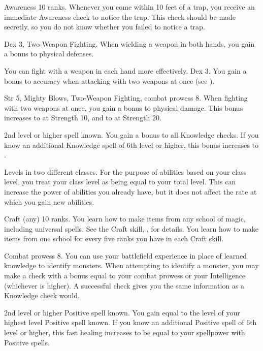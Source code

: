 \featpre Awareness 10 ranks.
\featben Whenever you come within 10 feet of a trap, you receive an immediate Awareness check to notice the trap.
This check should be made secretly, so you do not know whether you failed to notice a trap.

\featpres Dex 3, Two-Weapon Fighting.
\featben When wielding a weapon in both hands, you gain a  bonus to physical defenses.

You can fight with a weapon in each hand more effectively.
\featpre Dex 3.
\featben You gain a  bonus to accuracy when attacking with two weapons at once (see ).

\featpres Str 5, Mighty Blows, Two-Weapon Fighting, combat prowess 8.
\featben When fighting with two weapons at once, you gain a  bonus to physical damage.
This bonus increases to  at Strength 10, and to  at Strength 20.

\featpre 2nd level or higher  spell known.
\featben You gain a  bonus to all Knowledge checks.
If you know an additional Knowledge spell of 6th level or higher, this bonus increases to .

\featpre Levels in two different classes.
\featben For the purpose of abilities based on your class level, you treat your class level as being equal to your total level.
This can increase the power of abilities you already have, but it does not affect the rate at which you gain new abilities.

\featpre Craft (any) 10 ranks.
\featben You learn how to make items from any school of magic, including universal spells.
See the Craft skill, , for details.
You learn how to make items from one school for every five ranks you have in each Craft skill.

\featpre Combat prowess 8.
\featben You can use your battlefield experience in place of learned knowledge to identify monsters.
When attempting to identify a monster, you may make a check with a bonus equal to your combat prowess or your Intelligence (whichever is higher).
A successful check gives you the same information as a Knowledge check would.

\featpre 2nd level or higher Positive spell known.
\featben You gain  equal to the level of your highest level Positive spell known.
If you know an additional Positive spell of 6th level or higher, this fast healing increases to be equal to your spellpower with Positive spells.

